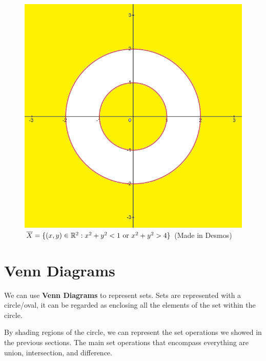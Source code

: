 \documentclass[../Latex-Setup/setup.tex]{subfiles}
\begin{document}
\begin{figure}[H]
\begin{minipage}{0.45\textwidth}
        \includegraphics[scale=0.45]{./images/Set-X-Complement.png}
        \caption{$\overline{X} = \{(x,y) \in \mathbb R^2 : x^2 + y^2 < 1 \text{ or } x^2 + y^2 > 4\}$ (Made in Desmos)}
    \end{minipage}
\end{figure}
\par

\section{Venn Diagrams}

\indent We can use \textbf{Venn Diagrams} to represent sets. Sets are represented with a circle/oval,
it can be regarded as enclosing all the elements of the set within the circle.\par

\indent By shading regions of the circle, we can represent the set operations we showed in the previous sections.
The main set operations that encompass everything are union, intersection, and difference.\par
\end{document}
